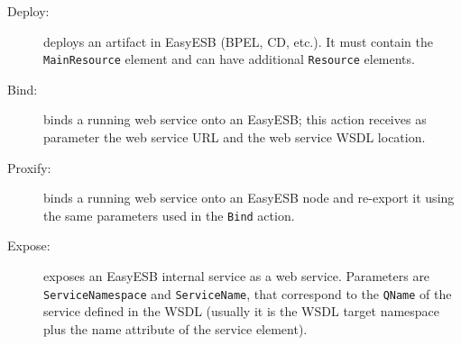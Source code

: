\documentclass[a4paper, 10pt]{article}
\begin{document}
\begin{description}
\item [Deploy:] deploys an artifact in EasyESB (BPEL, CD, etc.). It must contain the \texttt{MainResource} element and can have additional \texttt{Resource} elements.
\item [Bind:] binds a running web service onto an EasyESB; this action receives as parameter the web service URL and the web service WSDL location. 
\item [Proxify:] binds a running web service onto an EasyESB node and re-export it using the same parameters used in the \texttt{Bind} action.
\item [Expose:] exposes an EasyESB internal service as a web service. Parameters are \texttt{ServiceNamespace} and \texttt{ServiceName}, that correspond to the \texttt{QName} of the service defined in the WSDL (usually it is the WSDL target namespace plus the name attribute of the service element).
\end{description}
\end{document}

